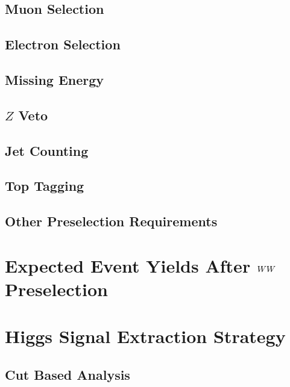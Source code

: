 \documentclass{cmspaper}
\begin{document}
  \subsection{Muon Selection} 
%   
  \subsection{Electron Selection} 
%    
  \subsection{Missing Energy} 
%    
  \subsection{$Z$ Veto}
%    
  \subsection{Jet Counting} 
%    
  \subsection{Top Tagging}
%    
  \subsection{Other Preselection Requirements}
%    

\section{Expected Event Yields After $WW$ Preselection}
%  

\clearpage    
\section{Higgs Signal Extraction Strategy}
%  
  \subsection{Cut Based Analysis}
\end{document}
